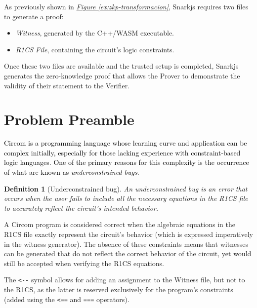 \documentclass[a4paper,12pt]{report}
\newtheorem{definition}{Definition}
\begin{document}
	\noindent As previously shown in \hyperref[ex:zkp-transformacion]{\textit{Figure \ref{ex:zkp-transformacion}}}, Snarkjs requires two files to generate a proof:
	
	\begin{itemize}
		\item  \textit{Witness}, generated by the C++/WASM executable.
		\item  \textit{R1CS File}, containing the circuit's logic constraints.
	\end{itemize}
	
	\vspace{0.25cm}
	
	\noindent Once these two files are available and the trusted setup is completed, Snarkjs generates the zero-knowledge proof that allows the Prover to demonstrate the validity of their statement to the Verifier.
	
	\section{Problem Preamble}
	\label{sec:descripcion-problema-ingles}
	
	\noindent 
	\textcolor{black}{Circom is a programming language whose learning curve and application can be complex initially, especially for those lacking experience with constraint-based logic languages. One of the primary reasons for this complexity is the occurrence of what are known as \textit{underconstrained bugs}. }
	
	\begin{definition}[Underconstrained bug]
		\vspace{0.2cm}
		\noindent An underconstrained bug is an error that occurs when the user fails to include all the necessary equations in the R1CS file to accurately reflect the circuit's intended behavior.
		
		\label{def:underconstrained-bug-ingles}
	\end{definition}
	
	\vspace{0.2cm}
	\noindent A Circom program is considered correct when the algebraic equations in the R1CS file exactly represent the circuit's behavior (which is expressed imperatively in the witness generator). The absence of these constraints means that witnesses can be generated that do not reflect the correct behavior of the circuit, yet would still be accepted when verifying the R1CS equations.
	
	\vspace{0.2cm}
	\noindent The \texttt{<-}\texttt{-} symbol allows for adding an assignment to the Witness file, but not to the R1CS, as the latter is reserved exclusively for the program's constraints (added using the \texttt{<==} and \texttt{===} operators). 
	
\end{document}

